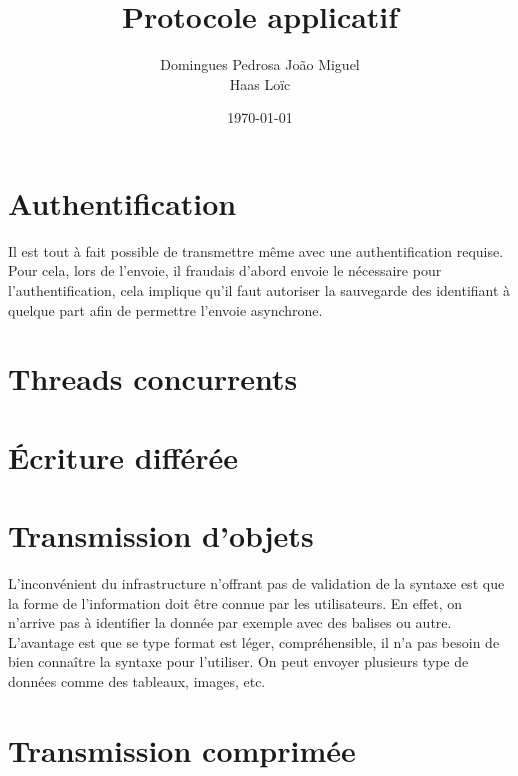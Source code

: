 \documentclass[10pt,a4paper]{article}
\author{Domingues Pedrosa João Miguel \\ Haas Loïc}
\title{Protocole applicatif}
\date{\today}
\begin{document}
\maketitle
\newpage
\tableofcontents
\newpage


\section{Authentification}

Il est tout à fait possible de transmettre même avec une authentification requise.
Pour cela, lors de l'envoie, il fraudais d'abord envoie le nécessaire pour l'authentification, cela implique qu'il faut autoriser la sauvegarde des identifiant à quelque part afin de permettre l'envoie asynchrone.

\section{Threads concurrents}



\section{Écriture différée}

\section{Transmission d'objets}

L'inconvénient du infrastructure n'offrant pas de validation de la syntaxe est que la forme de l'information doit être connue par les utilisateurs. 
En effet, on n'arrive pas à identifier la donnée par exemple avec des balises ou autre.
L'avantage est que se type format est léger, compréhensible, il n'a pas besoin de bien connaître la syntaxe pour l'utiliser.
On peut envoyer plusieurs type de données comme des tableaux, images, etc.

\section{Transmission comprimée}
\end{document}
